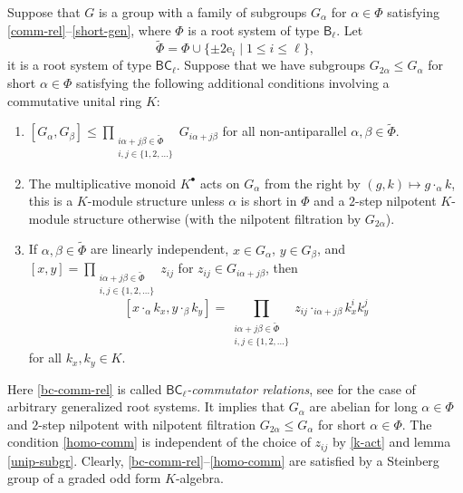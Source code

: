 \documentclass{article}
\theoremstyle{definition}
\begin{document}
Suppose that \(G\) is a group with a family of subgroups \(G_\alpha\) for \(\alpha \in \Phi\) satisfying \ref{comm-rel}--\ref{short-gen}, where \(\Phi\) is a root system of type \(\mathsf B_\ell\). Let \[
    \widetilde \Phi
    =
    \Phi \cup \{
        \pm 2 \mathrm e_i \mid 1 \leq i \leq \ell
    \},
\]
it is a root system of type \(\mathsf{BC}_\ell\). Suppose that we have subgroups \(G_{2 \alpha} \leq G_\alpha\) for short \(\alpha \in \Phi\) satisfying the following additional conditions involving a commutative unital ring \(K\):
\begin{enumerate}[label = {(C\arabic*)}, start = 6]

    \item \label{bc-comm-rel} \(
        [G_\alpha, G_\beta] \leq \prod_{\substack{
            i \alpha + j \beta \in \widetilde \Phi\\
            i, j \in \{1, 2, \ldots\}
        }} G_{i \alpha + j \beta}
    \) for all non-antiparallel \(
        \alpha, \beta \in \widetilde \Phi
    \).

    \item \label{k-act} The multiplicative monoid \(K^\bullet\) acts on \(G_\alpha\) from the right by \(
        (g, k) \mapsto g \cdot_\alpha k
    \), this is a \(K\)-module structure unless \(\alpha\) is short in \(\Phi\) and a \(2\)-step nilpotent \(K\)-module structure otherwise (with the nilpotent filtration by \(G_{2 \alpha}\)).

    \item \label{homo-comm} If \(
        \alpha, \beta \in \widetilde \Phi
    \) are linearly independent, \(
        x \in G_\alpha
    \), \(
        y \in G_\beta
    \), and \(
        [x, y] = \prod_{\substack{
            i \alpha + j \beta \in \widetilde \Phi\\
            i, j \in \{1, 2, \ldots\}
        }} z_{ij}
    \) for \(
        z_{ij} \in G_{i \alpha + j \beta}
    \), then \[
        [x \cdot_\alpha k_x, y \cdot_\beta k_y]
        =
        \prod_{\substack{
            i \alpha + j \beta \in \widetilde \Phi\\
            i, j \in \{1, 2, \ldots\}
        }} z_{ij}
            \cdot_{i \alpha + j \beta} k_x^i k_y^j
    \] for all \(
        k_x, k_y \in K
    \).

\end{enumerate}
Here \ref{bc-comm-rel} is called \textit{\(\mathsf{BC}_\ell\)-commutator relations}, see \cite[definition 3.2]{st-jordan} for the case of arbitrary generalized root systems. It implies that \(G_\alpha\) are abelian for long \(\alpha \in \Phi\) and \(2\)-step nilpotent with nilpotent filtration \(
    G_{2 \alpha} \leq G_\alpha
\) for short \(\alpha \in \Phi\). The condition \ref{homo-comm} is independent of the choice of \(z_{ij}\) by \ref{k-act} and lemma \ref{unip-subgr}. Clearly, \ref{bc-comm-rel}--\ref{homo-comm} are satisfied by a Steinberg group of a graded odd form \(K\)-algebra.
\end{document}
